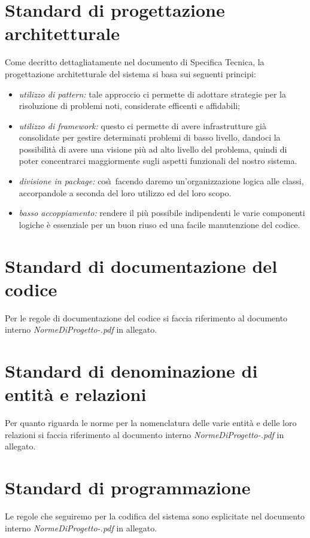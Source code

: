 \section{Standard di progettazione architetturale}
Come decritto dettagliatamente nel documento di Specifica Tecnica, la
progettazione architetturale del sistema si basa sui seguenti principi:

\begin{itemize}
  \item \emph{utilizzo di pattern:} tale approccio ci permette di adottare
  strategie per la risoluzione di problemi noti, considerate efficenti e affidabili;
  \item \emph{utilizzo di framework:} questo ci permette di avere infrastrutture
  gi\`a consolidate per gestire determinati problemi di basso livello, dandoci
  la possibilit\`a di avere una visione pi\`u ad alto livello del problema,
  quindi di poter concentrarci maggiormente sugli aspetti funzionali del nostro
  sistema.
  \item \emph{divisione in package:} cos\`\i\ facendo daremo un'organizzazione
  logica alle classi, accorpandole a seconda del loro utilizzo ed del loro
  scopo.
  \item \emph{basso accoppiamento:} rendere il pi\`u possibile indipendenti le
  varie componenti logiche \`e essenziale per un buon riuso ed una facile
  manutenzione del codice.
\end{itemize}

\section{Standard di documentazione del codice}
Per le regole di documentazione del codice si faccia riferimento al documento
interno \emph{NormeDiProgetto-\versionenormeprogetto.pdf} in allegato.

\section{Standard di denominazione di entit\`a e relazioni}
Per quanto riguarda le norme per la nomenclatura delle varie entit\`a e delle
loro relazioni si faccia riferimento al documento interno
\emph{NormeDiProgetto-\versionenormeprogetto.pdf} in allegato.

\section{Standard di programmazione}
Le regole che seguiremo per la codifica del sistema sono esplicitate nel
documento interno \emph{NormeDiProgetto-\versionenormeprogetto.pdf} in allegato.

